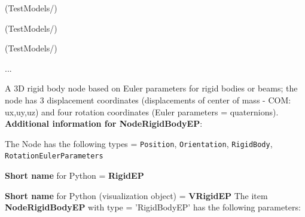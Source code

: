 \item {} (TestModels/)
\item {} (TestModels/)
\item {} (TestModels/)
\item  ...

\ei

%
\newpage

\label{sec:item:NodeRigidBodyEP}
A 3D rigid body node based on Euler parameters for rigid bodies or beams; the node has 3 displacement coordinates (displacements of center of mass - COM: ux,uy,uz) and four rotation coordinates (Euler parameters = quaternions).\vspace{12pt}
 \\{\bf Additional information for NodeRigidBodyEP}:
\bi
  \item The Node has the following types = \texttt{Position}, \texttt{Orientation}, \texttt{RigidBody}, \texttt{RotationEulerParameters}
  \item {\bf Short name} for Python = {\bf RigidEP}  \item {\bf Short name} for Python (visualization object) = {\bf VRigidEP}\ei
\vspace{12pt} \noindent The item {\bf NodeRigidBodyEP} with type = 'RigidBodyEP' has the following parameters:\vspace{-1cm}\\ 
